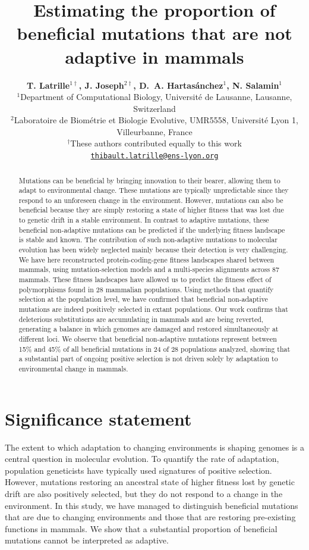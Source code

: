 \documentclass{article}
\title{Estimating the proportion of beneficial mutations that are not adaptive in mammals}
\author{
    \large
    \textbf{T. {Latrille}$^{1\dag}$\orcidlink{0000-0002-9643-4668}, J. {Joseph}$^{2\dag}$\orcidlink{0009-0002-1312-9930}, D.~A. {Hartasánchez}$^{1}$\orcidlink{0000-0003-2596-6883}, N. {Salamin}$^{1}$\orcidlink{0000-0002-3963-4954}}\\
    \normalsize
    $^{1}$Department of Computational Biology, Université de Lausanne, Lausanne, Switzerland\\
    $^{2}$Laboratoire de Biométrie et Biologie Evolutive, UMR5558, Université Lyon 1, Villeurbanne, France \\
    $^{\dag}$These authors contributed equally to this work\\
    \texttt{\href{mailto:thibault.latrille@ens-lyon.org}{thibault.latrille@ens-lyon.org}} \\
}
\begin{document}
    \maketitle

    \begin{abstract}
        Mutations can be beneficial by bringing innovation to their bearer, allowing them to adapt to environmental change. These mutations are typically unpredictable since they respond to an unforeseen change in the environment. However, mutations can also be beneficial because they are simply restoring a state of higher fitness that was lost due to genetic drift in a stable environment. In contrast to adaptive mutations, these beneficial non-adaptive mutations can be predicted if the underlying fitness landscape is stable and known. The contribution of such non-adaptive mutations to molecular evolution has been widely neglected mainly because their detection is very challenging. We have here reconstructed protein-coding-gene fitness landscapes shared between mammals, using mutation-selection models and a multi-species alignments across 87 mammals. These fitness landscapes have allowed us to predict the fitness effect of polymorphisms found in 28 mammalian populations. Using methods that quantify selection at the population level, we have confirmed that beneficial non-adaptive mutations are indeed positively selected in extant populations. Our work confirms that deleterious substitutions are accumulating in mammals and are being reverted, generating a balance in which genomes are damaged and restored simultaneously at different loci. We observe that beneficial non-adaptive mutations represent between 15\% and 45\% of all beneficial mutations in 24 of 28 populations analyzed, showing that a substantial part of ongoing positive selection is not driven solely by adaptation to environmental change in mammals.
    \end{abstract}


    \section*{Significance statement}
    The extent to which adaptation to changing environments is shaping genomes is a central question in molecular evolution. To quantify the rate of adaptation, population geneticists have typically used signatures of positive selection. However, mutations restoring an ancestral state of higher fitness lost by genetic drift are also positively selected, but they do not respond to a change in the environment. In this study, we have managed to distinguish beneficial mutations that are due to changing environments and those that are restoring pre-existing functions in mammals. We show that a substantial proportion of beneficial mutations cannot be interpreted as adaptive.
\end{document}
